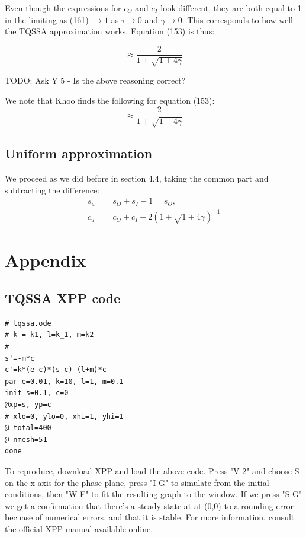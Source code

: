 \documentclass[12pt]{article}
\begin{document}
Even though the expressions for $c_O$ and $c_I$ look different, they
are both equal to 1 in the limiting as (161) $\to 1$ as $\tau \to 0$
and $\gamma \to 0$. This corresponds to how well the TQSSA
approximation works. Equation (153) is thus:

\begin{equation}
\approx \frac{2} {1 + \sqrt{1+4\gamma}}
\end{equation}

TODO: Ask Y 5 - Is the above reasoning correct?

We note that Khoo finds the following for equation (153):
\begin{equation}
\approx \frac{2}{1+\sqrt{1-4\gamma}}
\end{equation}

\subsection{Uniform approximation}

We proceed as we did before in section 4.4, taking the common part and
subtracting the difference:
\begin{align}
s_u &= s_O + s_I - 1 = s_O, \\
c_u &= c_O + c_I - 2(1 + \sqrt{1+4\gamma})^{-1}
\end{align}

\section{Appendix}

\subsection{TQSSA XPP code}
\begin{verbatim}
# tqssa.ode
# k = k1, l=k_1, m=k2
#
s'=-m*c
c'=k*(e-c)*(s-c)-(l+m)*c
par e=0.01, k=10, l=1, m=0.1
init s=0.1, c=0
@xp=s, yp=c
# xlo=0, ylo=0, xhi=1, yhi=1
@ total=400
@ nmesh=51
done
\end{verbatim}

To reproduce, download XPP and load the above code. Press "V 2" and
choose S on the x-axis for the phase plane, press "I G" to simulate
from the initial conditions, then "W F" to fit the resulting graph to
the window. If we press "S G" we get a confirmation that there's a
steady state at at (0,0) to a rounding error becuase of numerical
errors, and that it is stable. For more information, consult the
official XPP manual available online.
\end{document}

